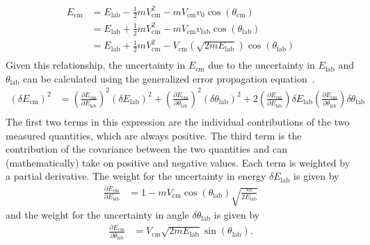 \begin{equation}
\begin{split}
E_\mathrm{cm}&=E_\mathrm{lab}-\frac{1}{2} m V_\mathrm{cm}^2 -m V_\mathrm{cm}v_0 \cos(\theta_\mathrm{cm})\\
&=E_\mathrm{lab}+\frac{1}{2} m V_\mathrm{cm}^2 -m V_\mathrm{cm}v_\mathrm{lab} \cos(\theta_\mathrm{lab})\\
&=E_\mathrm{lab}+\frac{1}{2} m V_\mathrm{cm}^2 - V_\mathrm{cm}(\sqrt{2mE_\mathrm{lab}})\cos(\theta_\mathrm{lab})\\
\end{split}
\label{ecm3}
\end{equation}
Given this relationship, the uncertainty in $E_\mathrm{cm}$ due to the uncertainty in $E_\mathrm{lab}$ and $\theta_\mathrm{lab}$ can be calculated using the generalized error propagation equation~\cite{Bevington_2003,Drosq_2007}.
\begin{equation}
\begin{split}
\left(\delta E_\mathrm{cm}\right)^2&=\left(\frac{\partial E_\mathrm{cm}}{\partial E_\mathrm{lab}}\right)^2\left(\delta E_\mathrm{lab}\right)^2+\left(\frac{\partial E_\mathrm{cm}}{\partial \theta_\mathrm{lab}}\right)^2\left(\delta \theta_\mathrm{lab}\right)^2
+2\left(\frac{\partial E_\mathrm{cm}}{\partial E_\mathrm{lab}}\right) \delta E_\mathrm{lab} \left(\frac{\partial E_\mathrm{cm}}{\partial \theta_\mathrm{lab}}\right)\delta \theta_\mathrm{lab}\\
\end{split}
\label{eq:delta_z4}
\end{equation}
The first two terms in this expression are the individual contributions of the two measured quantities, which are always positive.  The third term is the contribution of the covariance between the two quantities and can (mathematically) take on positive and negative values.  Each term is weighted by a partial derivative.  The weight for the uncertainty in energy $\delta E_\mathrm{lab}$ is given by
\begin{equation}
\begin{split}
\frac{\partial E_\mathrm{cm}}{\partial E_\mathrm{lab}}&=1-mV_\mathrm{cm}\cos(\theta_\mathrm{lab}) \sqrt{\frac{m}{2E_\mathrm{lab}}}
\end{split}
\label{eq:delta_E}
\end{equation}
and the weight for the uncertainty in angle $\delta \theta_\mathrm{lab}$ is given by
\begin{equation}
\begin{split}
\frac{\partial E_\mathrm{cm}}{\partial \theta_\mathrm{lab}}&=V_\mathrm{cm}\sqrt{2mE_\mathrm{lab}}\sin(\theta_\mathrm{lab}).
\end{split}
\label{eq:delta_theta}
\end{equation}

